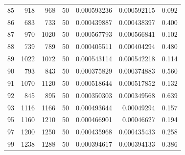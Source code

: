 \begin{tabular}{r r r r r r r}
85 & 918 & 968 & 50 & 0.000593236 & 0.000592115 & 0.092 \\
86 & 683 & 733 & 50 & 0.000439887 & 0.000438397 & 0.400 \\
87 & 970 & 1020 & 50 & 0.000567793 & 0.000566841 & 0.102 \\
88 & 739 & 789 & 50 & 0.000405511 & 0.000404294 & 0.480 \\
89 & 1022 & 1072 & 50 & 0.000543114 & 0.000542218 & 0.114 \\
90 & 793 & 843 & 50 & 0.000375829 & 0.000374883 & 0.560 \\
91 & 1070 & 1120 & 50 & 0.000518644 & 0.000517852 & 0.132 \\
92 & 845 & 895 & 50 & 0.000350303 & 0.000349568 & 0.639 \\
93 & 1116 & 1166 & 50 & 0.000493644 & 0.00049294 & 0.157 \\
95 & 1160 & 1210 & 50 & 0.000466901 & 0.00046627 & 0.194 \\
97 & 1200 & 1250 & 50 & 0.000435968 & 0.000435433 & 0.258 \\
99 & 1238 & 1288 & 50 & 0.000394617 & 0.000394133 & 0.386 \\
\bottomrule
\end{tabular}
